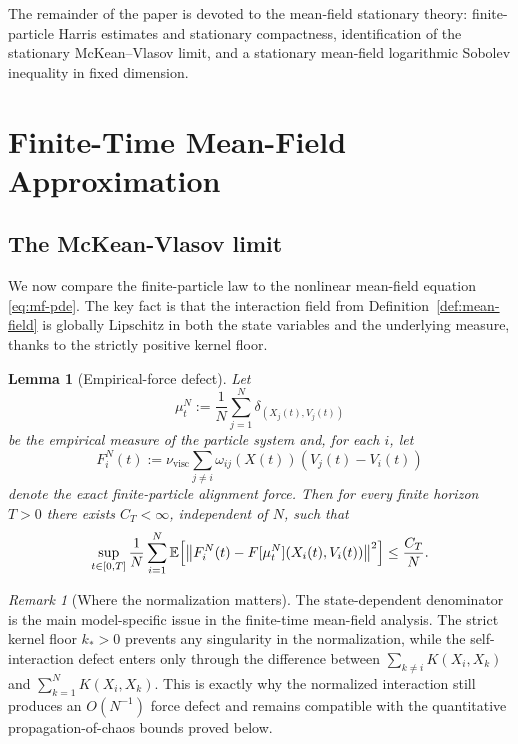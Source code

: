 \documentclass[11pt]{article}
\newtheorem{lemma}[theorem]{Lemma}
\theoremstyle{definition}
\theoremstyle{remark}
\newtheorem{remark}[theorem]{Remark}
\newcommand{\E}{\mathbb{E}}
\begin{document}
The remainder of the paper is devoted to the mean-field stationary theory:
finite-particle Harris estimates and stationary compactness, identification of
the stationary McKean--Vlasov limit, and a stationary mean-field logarithmic
Sobolev inequality in fixed dimension.

\section{Finite-Time Mean-Field Approximation}

\subsection{The McKean-Vlasov limit}

We now compare the finite-particle law to the nonlinear mean-field equation
\eqref{eq:mf-pde}. The key fact is that the interaction field from
Definition~\ref{def:mean-field} is globally Lipschitz in both the state
variables and the underlying measure, thanks to the strictly positive kernel
floor.

\begin{lemma}[Empirical-force defect]\label{lem:force-defect}
Let
\[
\mu_t^N:=\frac1N\sum_{j=1}^N \delta_{(X_j(t),V_j(t))}
\]
be the empirical measure of the particle system and, for each $i$, let
\[
F_i^N(t):=
\nu_{\mathrm{visc}}\sum_{j\neq i}\omega_{ij}(X(t))(V_j(t)-V_i(t))
\]
denote the exact finite-particle alignment force. Then for every finite horizon
$T>0$ there exists $C_T<\infty$, independent of $N$, such that
\[
\sup_{t\in[0,T]}
\frac1N\sum_{i=1}^N
\E\Bigl[\bigl\|
F_i^N(t)-F[\mu_t^N](X_i(t),V_i(t))
\bigr\|^2\Bigr]
\leq
\frac{C_T}{N}.
\]
\end{lemma}

\begin{remark}[Where the normalization matters]
The state-dependent denominator is the main model-specific issue in the
finite-time mean-field analysis. The strict kernel floor \(k_*>0\) prevents any
singularity in the normalization, while the self-interaction defect enters only
through the difference between \(\sum_{k\neq i}K(X_i,X_k)\) and
\(\sum_{k=1}^N K(X_i,X_k)\). This is exactly why the normalized interaction
still produces an \(O(N^{-1})\) force defect and remains compatible with the
quantitative propagation-of-chaos bounds proved below.
\end{remark}
\end{document}
